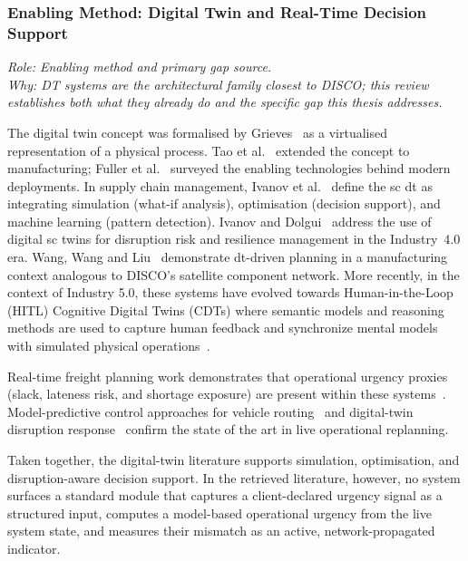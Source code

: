 \subsubsection{Enabling Method: Digital Twin and Real-Time Decision Support}
\label{subsec:dt}

\noindent\textit{Role: Enabling method and primary gap source. \\ Why: DT systems are the
architectural family closest to DISCO; this review establishes both what they already do
and the specific gap this thesis addresses.}

\medskip

The digital twin concept was formalised by Grieves~\autocite{grieves2014digital} as a
virtualised representation of a physical process. Tao et al.~\autocite{tao2018digital}
extended the concept to manufacturing; Fuller et al.~\autocite{fuller2020digital}
surveyed the enabling technologies behind modern deployments. In supply chain
management, Ivanov et al.~\autocite{ivanov2021digital} define the \gls{sc} \gls{dt} as
integrating simulation (what-if analysis), optimisation (decision support), and machine
learning (pattern detection). Ivanov and Dolgui~\autocite{ivanov2020digital} address the
use of digital \gls{sc} twins for disruption risk and resilience management in the
Industry~4.0 era. Wang, Wang and Liu~\autocite{wang2020digital} demonstrate
\gls{dt}-driven planning in a manufacturing context analogous to DISCO's satellite
component network. More recently, in the context of Industry 5.0, these systems have evolved towards Human-in-the-Loop (HITL) Cognitive Digital Twins (CDTs) where semantic models and reasoning methods are used to capture human feedback and synchronize mental models with simulated physical operations~\autocite{niloofar2023}.

Real-time freight planning work demonstrates that operational urgency proxies (slack, lateness risk, and shortage exposure) are present within these
systems~\autocite{hrusovsky2021realtime,perez2022digital}. Model-predictive control
approaches for vehicle routing~\autocite{karam2022realtime} and digital-twin disruption
response~\autocite{ding2023realtime,leung2022digital,zhu2025industry5} confirm the
state of the art in live operational replanning.

Taken together, the digital-twin literature supports simulation, optimisation, and
disruption-aware decision support. In the retrieved literature, however, no system surfaces a standard module that captures a client-declared urgency signal as a structured input, computes a model-based operational urgency from the live system state, and measures their mismatch as an active, network-propagated indicator.

